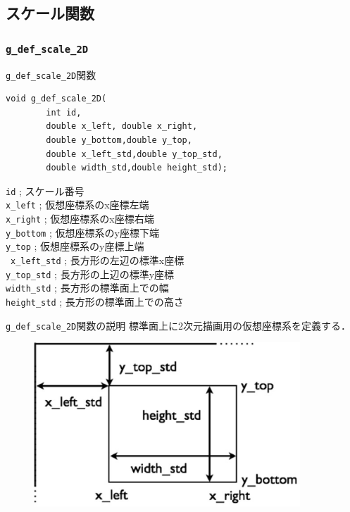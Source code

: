 \documentclass[a4paper,12pt]{jsarticle}%
\begin{document}
\clearpage
\subsection{スケール関数}

\subsubsection{\texttt{g\_def\_scale\_2D}}

\begin{itembox}[l]{\texttt{g\_def\_scale\_2D}関数}
\begin{verbatim}
void g_def_scale_2D(
        int id,
        double x_left, double x_right,
        double y_bottom,double y_top,
        double x_left_std,double y_top_std,
        double width_std,double height_std);
\end{verbatim}
\verb|id| ; スケール番号\\
\verb|x_left| ; 仮想座標系のx座標左端\\
\verb|x_right| ; 仮想座標系のx座標右端\\
\verb|y_bottom| ; 仮想座標系のy座標下端\\
\verb|y_top| ; 仮想座標系のy座標上端\\\
\verb|x_left_std| ; 長方形の左辺の標準x座標\\
\verb|y_top_std| ; 長方形の上辺の標準y座標\\
\verb|width_std| ; 長方形の標準面上での幅\\
\verb|height_std| ; 長方形の標準面上での高さ
\end{itembox}

\begin{itembox}[l]{\texttt{g\_def\_scale\_2D}関数の説明}
標準面上に2次元描画用の仮想座標系を定義する．
\end{itembox}

\begin{figure}[htb]
	\includegraphics[width=100mm]{./Figures/eps/Canvas_g_def_scale_2D.eps}
\end{figure}
\end{document}
